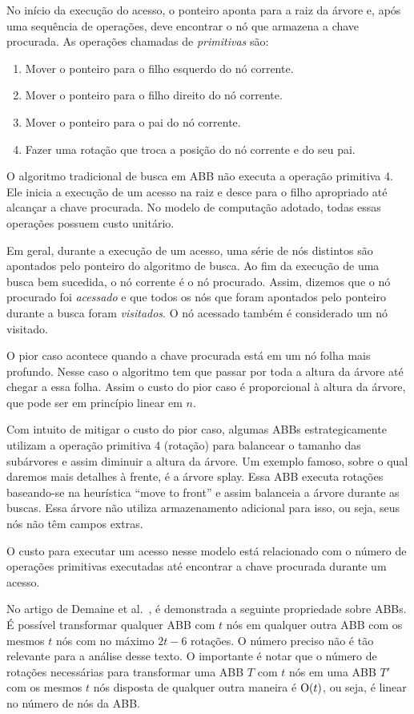 No início da execução do acesso, o ponteiro aponta para a raiz da árvore e, após uma sequência de operações, deve encontrar o nó que armazena a chave procurada. As operações chamadas de \textit{primitivas} são:
\begin{enumerate}
    \item Mover o ponteiro para o filho esquerdo do nó corrente.
    \item Mover o ponteiro para o filho direito do nó corrente.
    \item Mover o ponteiro para o pai do nó corrente.
    \item Fazer uma rotação que troca a posição do nó corrente e do seu pai.
\end{enumerate}

O algoritmo tradicional de busca em ABB não executa a operação primitiva 4. Ele inicia a execução de um acesso na raiz e desce para o filho apropriado até alcançar a chave procurada. No modelo de computação adotado, todas essas operações possuem custo unitário.

Em geral, durante a execução de um acesso, uma série de nós distintos são apontados pelo ponteiro do algoritmo de busca. Ao fim da execução de uma busca bem sucedida, o nó corrente é o nó procurado. Assim, dizemos que o nó procurado foi \textit{acessado} e que todos os nós que foram apontados pelo ponteiro durante a busca foram \textit{visitados}. O nó acessado também é considerado um nó visitado.

O pior caso acontece quando a chave procurada está em um nó folha mais profundo. Nesse caso o algoritmo tem que passar por toda a altura da árvore até chegar a essa folha. Assim o custo do pior caso é proporcional à altura da árvore, que pode ser em princípio linear em $n$.

Com intuito de mitigar o custo do pior caso, algumas ABBs estrategicamente utilizam a operação primitiva 4 (rotação) para balancear o tamanho das subárvores e assim diminuir a altura da árvore. Um exemplo famoso, sobre o qual daremos mais detalhes à frente, é a árvore splay. Essa ABB executa rotações baseando-se na heurística ``move to front'' e assim balanceia a árvore durante as buscas. Essa árvore não utiliza armazenamento adicional para isso, ou seja, seus nós não têm campos extras.

O custo para executar um acesso nesse modelo está relacionado com o número de operações primitivas executadas até encontrar a chave procurada durante um acesso. 

No artigo de Demaine et al.~\cite{rotation_distance}, é demonstrada a seguinte propriedade sobre ABBs. É possível transformar qualquer ABB com $t$ nós em qualquer outra ABB com os mesmos $t$ nós com no máximo $2t - 6$ rotações. O número preciso não é tão relevante para a análise desse texto. O importante é notar que o número de rotações necessárias para transformar uma ABB $T$ com $t$ nós em uma ABB $T'$ com os mesmos $t$ nós disposta de qualquer outra maneira é $\mathrm{O}(t)$, ou seja, é linear no número de nós da ABB.

